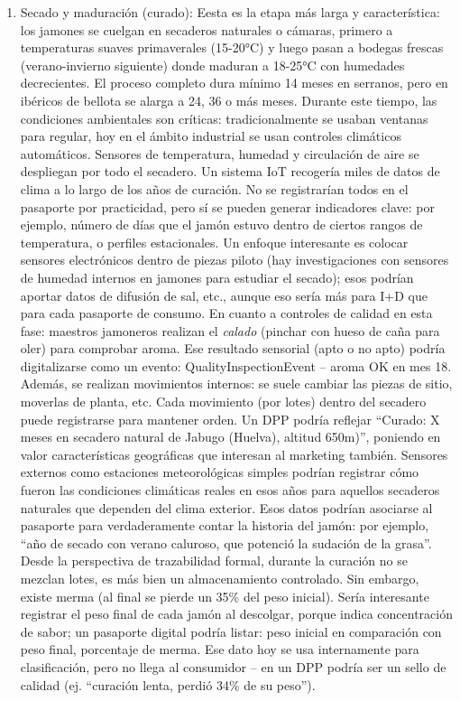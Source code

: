 \begin{enumerate}
    \item Secado y maduración (curado): Eesta es la etapa más larga y característica: los jamones se cuelgan en secaderos naturales o cámaras, primero a temperaturas suaves primaverales (15-20°C) y luego pasan a bodegas frescas (verano-invierno siguiente) donde maduran a 18-25°C con humedades decrecientes. El proceso completo dura mínimo 14 meses en serranos, pero en ibéricos de bellota se alarga a 24, 36 o más meses. Durante este tiempo, las condiciones ambientales son críticas: tradicionalmente se usaban ventanas para regular, hoy en el ámbito industrial se usan controles climáticos automáticos. Sensores de temperatura, humedad y circulación de aire se despliegan por todo el secadero. Un sistema IoT recogería miles de datos de clima a lo largo de los años de curación. No se registrarían todos en el pasaporte por practicidad, pero sí se pueden generar indicadores clave: por ejemplo, número de días que el jamón estuvo dentro de ciertos rangos de temperatura, o perfiles estacionales. Un enfoque interesante es colocar sensores electrónicos dentro de piezas piloto (hay investigaciones con sensores de humedad internos en jamones para estudiar el secado); esos podrían aportar datos de difusión de sal, etc., aunque eso sería más para I+D que para cada pasaporte de consumo. En cuanto a controles de calidad en esta fase: maestros jamoneros realizan el \textit{calado} (pinchar con hueso de caña para oler) para comprobar aroma. Ese resultado sensorial (apto o no apto) podría digitalizarse como un evento: QualityInspectionEvent – aroma OK en mes 18. Además, se realizan movimientos internos: se suele cambiar las piezas de sitio, moverlas de planta, etc. Cada movimiento (por lotes) dentro del secadero puede registrarse para mantener orden. Un DPP podría reflejar “Curado: X meses en secadero natural de Jabugo (Huelva), altitud 650m)”, poniendo en valor características geográficas que interesan al marketing también. Sensores externos como estaciones meteorológicas simples podrían registrar cómo fueron las condiciones climáticas reales en esos años para aquellos secaderos naturales que dependen del clima exterior. Esos datos podrían asociarse al pasaporte para verdaderamente contar la historia del jamón: por ejemplo, “año de secado con verano caluroso, que potenció la sudación de la grasa”. Desde la perspectiva de trazabilidad formal, durante la curación no se mezclan lotes, es más bien un almacenamiento controlado. Sin embargo, existe merma (al final se pierde un 35\% del peso inicial). Sería interesante registrar el peso final de cada jamón al descolgar, porque indica concentración de sabor; un pasaporte digital podría listar: peso inicial en comparación con peso final, porcentaje de merma. Ese dato hoy se usa internamente para clasificación, pero no llega al consumidor – en un DPP podría ser un sello de calidad (ej. “curación lenta, perdió 34\% de su peso”).

\end{enumerate}
